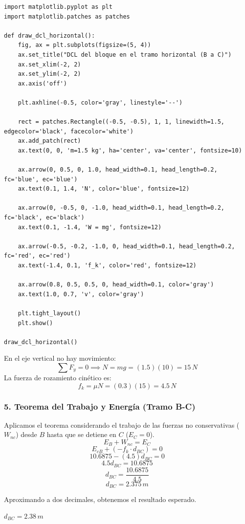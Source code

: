 \documentclass[12pt, a4paper]{article}
\begin{document}
\begin{lstlisting}
import matplotlib.pyplot as plt
import matplotlib.patches as patches

def draw_dcl_horizontal():
    fig, ax = plt.subplots(figsize=(5, 4))
    ax.set_title("DCL del bloque en el tramo horizontal (B a C)")
    ax.set_xlim(-2, 2)
    ax.set_ylim(-2, 2)
    ax.axis('off')
    
    plt.axhline(-0.5, color='gray', linestyle='--')
    
    rect = patches.Rectangle((-0.5, -0.5), 1, 1, linewidth=1.5, edgecolor='black', facecolor='white')
    ax.add_patch(rect)
    ax.text(0, 0, 'm=1.5 kg', ha='center', va='center', fontsize=10)
    
    ax.arrow(0, 0.5, 0, 1.0, head_width=0.1, head_length=0.2, fc='blue', ec='blue')
    ax.text(0.1, 1.4, 'N', color='blue', fontsize=12)
    
    ax.arrow(0, -0.5, 0, -1.0, head_width=0.1, head_length=0.2, fc='black', ec='black')
    ax.text(0.1, -1.4, 'W = mg', fontsize=12)
    
    ax.arrow(-0.5, -0.2, -1.0, 0, head_width=0.1, head_length=0.2, fc='red', ec='red')
    ax.text(-1.4, 0.1, 'f_k', color='red', fontsize=12)
    
    ax.arrow(0.8, 0.5, 0.5, 0, head_width=0.1, color='gray')
    ax.text(1.0, 0.7, 'v', color='gray')

    plt.tight_layout()
    plt.show()

draw_dcl_horizontal()
\end{lstlisting}

En el eje vertical no hay movimiento:
$$ \sum F_y = 0 \implies N = mg = (1.5)(10) = 15 \, \si{N} $$
La fuerza de rozamiento cinético es:
$$ f_k = \mu N = (0.3)(15) = 4.5 \, \si{N} $$

\subsubsection*{5. Teorema del Trabajo y Energía (Tramo B-C)}
Aplicamos el teorema considerando el trabajo de las fuerzas no conservativas ($W_{nc}$) desde $B$ hasta que se detiene en $C$ ($E_C = 0$).
$$ E_B + W_{nc} = E_C $$
$$ E_{cB} + (-f_k \cdot d_{BC}) = 0 $$
$$ 10.6875 - (4.5) d_{BC} = 0 $$
$$ 4.5 d_{BC} = 10.6875 $$
$$ d_{BC} = \frac{10.6875}{4.5} $$
$$ d_{BC} = 2.375 \, \si{m} $$

Aproximando a dos decimales, obtenemos el resultado esperado.

\begin{tcolorbox}[colback=green!5!white, colframe=green!50!black, title=Respuesta Final]
\centering \Large $d_{BC} = 2.38 \, \si{m}$
\end{tcolorbox}
\end{document}
